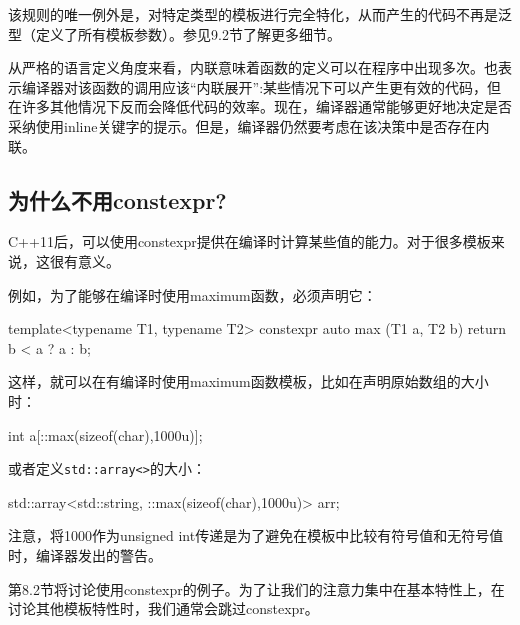 该规则的唯一例外是，对特定类型的模板进行完全特化，从而产生的代码不再是泛型（定义了所有模板参数）。参见9.2节了解更多细节。
 
从严格的语言定义角度来看，内联意味着函数的定义可以在程序中出现多次。也表示编译器对该函数的调用应该“内联展开”:某些情况下可以产生更有效的代码，但在许多其他情况下反而会降低代码的效率。现在，编译器通常能够更好地决定是否采纳使用inline关键字的提示。但是，编译器仍然要考虑在该决策中是否存在内联。

\subsection{为什么不用constexpr?}

C++11后，可以使用constexpr提供在编译时计算某些值的能力。对于很多模板来说，这很有意义。

例如，为了能够在编译时使用maximum函数，必须声明它：

\begin{cpp}
template<typename T1, typename T2>
constexpr auto max (T1 a, T2 b)
{
	return b < a ? a : b;
}
\end{cpp}

这样，就可以在有编译时使用maximum函数模板，比如在声明原始数组的大小时：

\begin{cpp}
int a[::max(sizeof(char),1000u)];
\end{cpp}

或者定义\texttt{std::array<>}的大小：

\begin{cpp}
std::array<std::string, ::max(sizeof(char),1000u)> arr;
\end{cpp}

注意，将1000作为unsigned int传递是为了避免在模板中比较有符号值和无符号值时，编译器发出的警告。

第8.2节将讨论使用constexpr的例子。为了让我们的注意力集中在基本特性上，在讨论其他模板特性时，我们通常会跳过constexpr。











